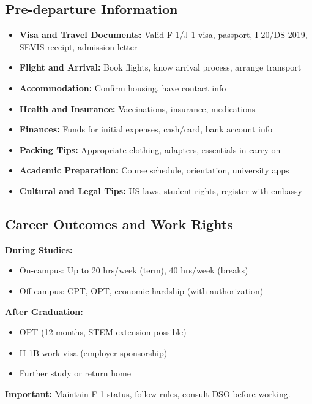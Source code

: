 \subsection{Pre-departure Information}
\begin{itemize}
    \item \textbf{Visa and Travel Documents:} Valid F-1/J-1 visa, passport, I-20/DS-2019, SEVIS receipt, admission letter
    \item \textbf{Flight and Arrival:} Book flights, know arrival process, arrange transport
    \item \textbf{Accommodation:} Confirm housing, have contact info
    \item \textbf{Health and Insurance:} Vaccinations, insurance, medications
    \item \textbf{Finances:} Funds for initial expenses, cash/card, bank account info
    \item \textbf{Packing Tips:} Appropriate clothing, adapters, essentials in carry-on
    \item \textbf{Academic Preparation:} Course schedule, orientation, university apps
    \item \textbf{Cultural and Legal Tips:} US laws, student rights, register with embassy
\end{itemize}

\subsection{Career Outcomes and Work Rights}
\textbf{During Studies:}
\begin{itemize}
    \item On-campus: Up to 20 hrs/week (term), 40 hrs/week (breaks)
    \item Off-campus: CPT, OPT, economic hardship (with authorization)
\end{itemize}
\textbf{After Graduation:}
\begin{itemize}
    \item OPT (12 months, STEM extension possible)
    \item H-1B work visa (employer sponsorship)
    \item Further study or return home
\end{itemize}
\textbf{Important:} Maintain F-1 status, follow rules, consult DSO before working.
